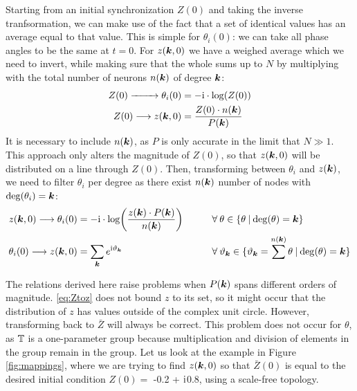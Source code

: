 Starting from an initial synchronization $Z(0)$ and taking the inverse tranfsormation, we can make use of the fact that a set of identical values has an average equal to that value. This is simple for $\theta_i(0)$: we can take all phase angles to be the same at $t = 0$. For $z({\boldsymbol{k}},0)$ we have a weighed average which we need to invert, while making sure that the whole sums up to $N$ by multiplying with the total number of neurons $n({\boldsymbol{k}})$ of degree ${\boldsymbol{k}}$:
\begin{align}
Z(0) \xrightarrow{\hspace*{8mm}} \theta_i(0) &= -\ic \cdot \log \left( Z(0) \right)  \label{eq:Ztotheta} \\
Z(0) \longrightarrow z(\k,0) &= \frac{Z(0) \cdot n(\k)}{P(\k)} \label{eq:Ztoz}
\end{align}
It is necessary to include $n({\boldsymbol{k}})$, as $P$ is only accurate in the limit that $N \gg 1$. This approach only alters the magnitude of $Z(0)$, so that $z({\boldsymbol{k}},0)$ will be distributed on a line through $Z(0)$. Then, transforming between $\theta_i$ and $z({\boldsymbol{k}})$, we need to filter $\theta_i$ per degree as there exist $n({\boldsymbol{k}})$ number of nodes with ${\rm deg} ( \theta_i ) = {\boldsymbol{k}}$:
\begin{alignat}{2}
z(\k,0) \longrightarrow \theta_i(0) &= -\ic \cdot \log \left( \frac{z(\k)\cdot P(\k)}{n(\k)} \right) \qquad &&\forall \: \theta \in \{ \theta \: | \: \degree(\theta) = \k \}  \label{eq:ztottheta}\\
\theta_i(0) \longrightarrow z(\k,0) &= \sum_{\k} e^{\ic \vartheta_{\k}} \qquad \qquad &&\forall \: \vartheta_{\k} \in \{ \vartheta_{\k} = \sum^{n(\k)} \theta \: | \: \degree(\theta) = \k \} \label{eq:thetatoz}
\end{alignat}

The relations derived here raise problems when $P({\boldsymbol{k}})$ spans different orders of magnitude. \eqref{eq:Ztoz} does not bound $z$ to its set, so it might occur that the distribution of $z$ has values outside of the complex unit circle. However, transforming back to $\bar{Z}$ will always be correct. This problem does not occur for $\theta$, as ${\mathbb{T}}$ is a one-parameter group because multiplication and division of elements in the group remain in the group. Let us look at the example in Figure \ref{fig:mappings}, where we are trying to find $z({\boldsymbol{k}}, 0)$ so that $\bar{Z}(0)$ is equal to the desired initial condition $Z(0) = $ -0.2 + ${\rm{i}}$0.8, using a scale-free topology. \\

